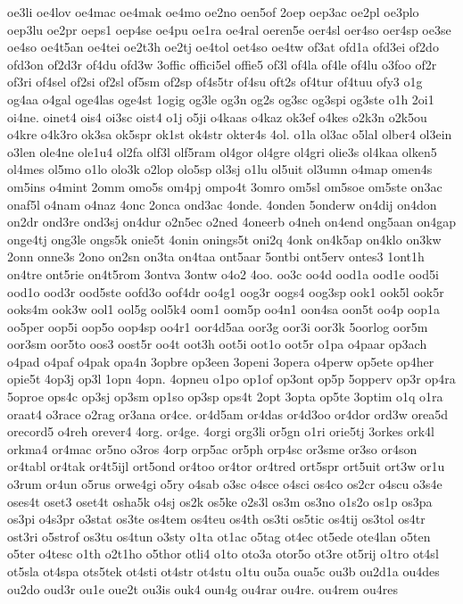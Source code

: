 {oe3li
oe4lov
oe4mac
oe4mak
oe4mo
oe2no
oen5of
2oep
oep3ac
oe2pl
oe3plo
oep3lu
oe2pr
oeps1
oep4se
oe4pu
oe1ra
oe4ral
oeren5e
oer4sl
oer4so
oer4sp
oe3se
oe4so
oe4t5an
oe4tei
oe2t3h
oe2tj
oe4tol
oet4so
oe4tw
of3at
ofd1a
ofd3ei
of2do
ofd3on
of2d3r
of4du
ofd3w
3offic
offici5el
offie5
of3l
of4la
of4le
of4lu
o3foo
of2r
of3ri
of4sel
of2si
of2sl
of5sm
of2sp
of4s5tr
of4su
oft2s
of4tur
of4tuu
ofy3
o1g
og4aa
o4gal
oge4las
oge4st
1ogig
og3le
og3n
og2s
og3sc
og3spi
og3ste
o1h
2oi1
oi4ne.
oinet4
ois4
oi3sc
oist4
o1j
o5ji
o4kaas
o4kaz
ok3ef
o4kes
o2k3n
o2k5ou
o4kre
o4k3ro
ok3sa
ok5spr
ok1st
ok4str
okter4s
4ol.
o1la
ol3ac
o5lal
olber4
ol3ein
o3len
ole4ne
ole1u4
ol2fa
olf3l
olf5ram
ol4gor
ol4gre
ol4gri
olie3s
ol4kaa
olken5
ol4mes
ol5mo
o1lo
olo3k
o2lop
olo5sp
ol3sj
o1lu
ol5uit
ol3umn
o4map
omen4s
om5ins
o4mint
2omm
omo5s
om4pj
ompo4t
3omro
om5sl
om5soe
om5ste
on3ac
onaf5l
o4nam
o4naz
4onc
2onca
ond3ac
4onde.
4onden
5onderw
on4dij
on4don
on2dr
ond3re
ond3sj
on4dur
o2n5ec
o2ned
4oneerb
o4neh
on4end
ong5aan
on4gap
onge4tj
ong3le
ongs5k
onie5t
4onin
onings5t
oni2q
4onk
on4k5ap
on4klo
on3kw
2onn
onne3s
2ono
on2sn
on3ta
on4taa
ont5aar
5ontbi
ont5erv
ontes3
1ont1h
on4tre
ont5rie
on4t5rom
3ontva
3ontw
o4o2
4oo.
oo3c
oo4d
ood1a
ood1e
ood5i
ood1o
ood3r
ood5ste
oofd3o
oof4dr
oo4g1
oog3r
oogs4
oog3sp
ook1
ook5l
ook5r
ooks4m
ook3w
ool1
ool5g
ool5k4
oom1
oom5p
oo4n1
oon4sa
oon5t
oo4p
oop1a
oo5per
oop5i
oop5o
oop4sp
oo4r1
oor4d5aa
oor3g
oor3i
oor3k
5oorlog
oor5m
oor3sm
oor5to
oos3
oost5r
oo4t
oot3h
oot5i
oot1o
oot5r
o1pa
o4paar
op3ach
o4pad
o4paf
o4pak
opa4n
3opbre
op3een
3openi
3opera
o4perw
op5ete
op4her
opie5t
4op3j
op3l
1opn
4opn.
4opneu
o1po
op1of
op3ont
op5p
5opperv
op3r
op4ra
5oproe
ops4c
op3sj
op3sm
op1so
op3sp
ops4t
2opt
3opta
op5te
3optim
o1q
o1ra
oraat4
o3race
o2rag
or3ana
or4ce.
or4d5am
or4das
or4d3oo
or4dor
ord3w
orea5d
orecord5
o4reh
orever4
4org.
or4ge.
4orgi
org3li
or5gn
o1ri
orie5tj
3orkes
ork4l
orkma4
or4mac
or5no
o3ros
4orp
orp5ac
or5ph
orp4sc
or3sme
or3so
or4son
or4tabl
or4tak
or4t5ijl
ort5ond
or4too
or4tor
or4tred
ort5spr
ort5uit
ort3w
or1u
o3rum
or4un
o5rus
orwe4gi
o5ry
o4sab
o3sc
o4sce
o4sci
os4co
os2cr
o4scu
o3s4e
oses4t
oset3
oset4t
osha5k
o4sj
os2k
os5ke
o2s3l
os3m
os3no
o1s2o
os1p
os3pa
os3pi
o4s3pr
o3stat
os3te
os4tem
os4teu
os4th
os3ti
os5tic
os4tij
os3tol
os4tr
ost3ri
o5strof
os3tu
os4tun
o3sty
o1ta
ot1ac
o5tag
ot4ec
ot5ede
ote4lan
o5ten
o5ter
o4tesc
o1th
o2t1ho
o5thor
otli4
o1to
oto3a
otor5o
ot3re
ot5rij
o1tro
ot4sl
ot5sla
ot4spa
ots5tek
ot4sti
ot4str
ot4stu
o1tu
ou5a
oua5c
ou3b
ou2d1a
ou4des
ou2do
oud3r
ou1e
oue2t
ou3is
ouk4
oun4g
ou4rar
ou4re.
ou4rem
ou4res
}
